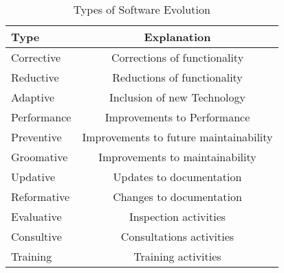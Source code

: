 \documentclass{sig-alternate}
\begin{document}
\begin{table}
       \centering
       \begin{tabular}[ht]{l|c}
              \toprule

              \textbf{Type}                              & \textbf{Explanation}    \\ \midrule
              Corrective    & Corrections of functionality                   \\ \hline
              Reductive     & Reductions of functionality                    \\ \hline
              Adaptive      & Inclusion of new Technology                    \\ \hline
              Performance   & Improvements to Performance                    \\ \hline
              Preventive    & Improvements to future maintainability         \\ \hline
              Groomative    & Improvements to maintainability                \\ \hline
              Updative      & Updates to documentation                       \\ \hline
              Reformative   & Changes to documentation                       \\ \hline
              Evaluative    & Inspection activities                          \\ \hline
              Consultive    & Consultations activities                       \\ \hline
              Training      & Training activities                            \\ 

              \bottomrule

       \end{tabular}
       \caption{Types of Software Evolution  \cite{chapin2001types}}
       \label{table:expl_types}
\end{table}
\end{document}
